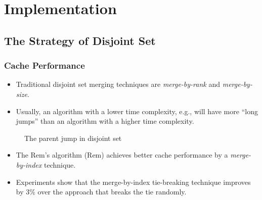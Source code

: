 \section{Implementation}

\subsection{The Strategy of Disjoint Set}

\begin{frame}
	\frametitle{Cache Performance}
	\begin{itemize}
		\setlength\itemsep{1em}
		\item
			Traditional disjoint set merging techniques are {\em merge-by-rank}
			and {\em merge-by-size}. 
		\item
			Usually, an algorithm with a lower time complexity, e.g.,
			will have more ``long jumps'' than an algorithm with a
			higher time complexity.
	\end{itemize}
	\begin{center}
	\scalebox{0.7} { \begin{minipage}{1.5\textwidth}
				\begin{figure}[!thb]
			  \centering {} 
			  \caption{The parent jump in disjoint set}
			  \label{fig:long-short-jump-disjoint}
			\end{figure}
			\end{minipage}
		}
	\end{center}
\end{frame}

\begin{frame}
	\begin{itemize}
		\setlength\itemsep{1em}
		\item
			The Rem's algorithm ({\sc Rem}) achieves better cache
			performance by a {\em merge-by-index} technique.
		\item
			Experiments show that the merge-by-index tie-breaking
			technique improves by 3\% over the approach that breaks the
			tie randomly.
	\end{itemize}
\end{frame}

